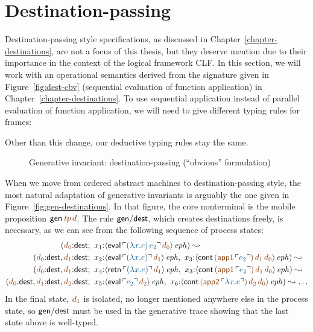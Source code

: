 \section{Destination-passing}
\label{sec:gen-destinations}

Destination-passing style specifications, as discussed in
Chapter~\ref{chapter-destinations}, are not a focus of this thesis,
but they deserve mention due to their importance in the context of the
logical framework CLF. In this section, we will work with an
operational semantics derived from the signature given in
Figure~\ref{fig:dest-cbv} (sequential evaluation of function
application) in Chapter~\ref{chapter-destinations}. To use sequential
application instead of parallel evaluation of function application, we
will need to give different typing rules for frames:

\smallskip
{}
\smallskip

\noindent
Other than this change, our deductive typing rules stay the same.


\begin{figure}[tp]
\caption{Generative invariant: destination-passing (``obvious'' formulation)}
\label{fig:gen-destinations2} 
\end{figure}

When we move from ordered abstract machines to destination-passing
style, the most natural adaptation of generative invariants is
arguably the one given in Figure~\ref{fig:gen-destinations}. In that
figure, the core nonterminal is the mobile proposition ${\sf
  gen}\,\lf{{\it tp}}\,\lf{d}$. The rule ${\sf gen/dest}$, which 
creates destinations freely, is
necessary, as we can see from the following sequence of 
process states:
\begin{align*}
( \lf{d_0}{:}{\sf dest}&; ~
       x_1{:}\iseph{\susp{{\sf eval}
          \,\lf{\interp{(\lambda x.e)\,e_2}}\,\lf{d_0}}}
) 
\leadsto
\\
( \lf{d_0}{:}{\sf dest}, \lf{d_1}{:}{\sf dest}&; ~ 
       x_2{:}\iseph{\susp{{\sf eval}\,\lf{\interp{(\lambda x.e)}}\,\lf{d_1}}}, ~
       x_3{:}\iseph{\susp{{\sf cont}
          \,\lf{({\sf app1}\,\interp{e_2})}\,\lf{d_1}\,\lf{d_0}}}
)
\leadsto
\\
( \lf{d_0}{:}{\sf dest}, \lf{d_1}{:}{\sf dest}&; ~ 
       x_4{:}\iseph{\susp{{\sf retn}\,\lf{\interp{(\lambda x.e)}}\,\lf{d_1}}}, ~
       x_3{:}\iseph{\susp{{\sf cont}
          \,\lf{({\sf app1}\,\interp{e_2})}\,\lf{d_1}\,\lf{d_0}}}
)
\leadsto
\\
( \lf{d_0}{:}{\sf dest}, \lf{d_1}{:}{\sf dest}, \lf{d_2}{:}{\sf dest}&; ~ 
       x_5{:}\iseph{\susp{{\sf eval}\,\lf{\interp{e_2}}\,\lf{d_2}}}, ~
       x_6{:}\iseph{\susp{{\sf cont}
          \,\lf{({\sf app2}\,\interp{\lambda x.e})}\,\lf{d_2}\,\lf{d_0}}}
)
\leadsto \ldots
\end{align*}
In the final state, $\lf{d_1}$ is isolated, no longer mentioned
anywhere else in the process state, so ${\sf gen/dest}$ must be used
in the generative trace showing that the last state above is well-typed.

